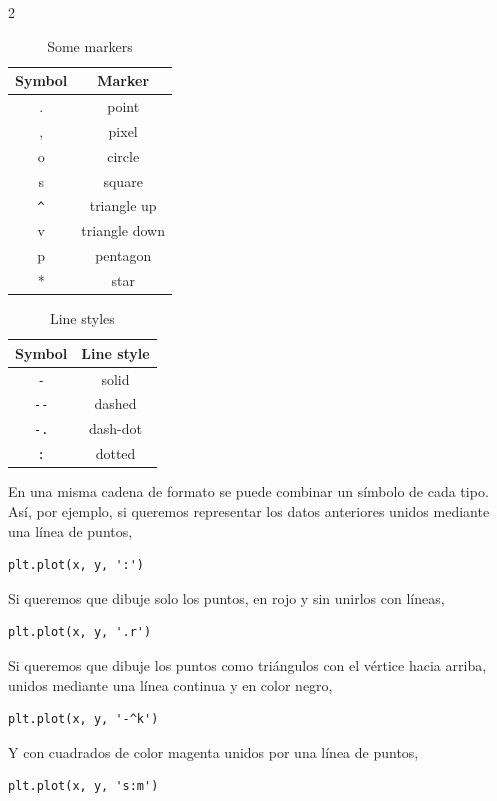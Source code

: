 \begin{paracol}{2}
    \begin{table}
        \centering
        \begin{tabular}{|c|c|} \hline
        \textbf{Symbol}     &  \textbf{Marker}\\ \hline
             .& point \\ \hline
             ,& pixel\\ \hline
             o& circle \\ \hline
             s& square\\ \hline
             \texttt{\^{}} & triangle up\\ \hline
             v& triangle down\\ \hline
             p& pentagon\\ \hline
             *& star\\ \hline
        \end{tabular}
        \caption{Some markers}
        \label{tab:dots}
    \end{table}

      \begin{table}
        \centering
        \begin{tabular}{|c|c|} \hline
        \textbf{Symbol}     &  \textbf{Line style}\\ \hline
             \texttt{-}& solid \\ \hline
             \texttt{-{}-}& dashed\\ \hline
             \texttt{-.}& dash-dot\\ \hline
             \texttt{:}& dotted\\ \hline
        \end{tabular}
        \caption{Line styles}
        \label{tab:lines}
    \end{table}

    \switchcolumn
    En una misma cadena de formato se puede combinar un símbolo de cada tipo. Así, por ejemplo, si queremos representar los datos anteriores unidos mediante una línea de puntos,
\begin{verbatim}
plt.plot(x, y, ':')
\end{verbatim}
Si queremos que dibuje solo los puntos, en rojo y sin unirlos con líneas,
\begin{verbatim}
plt.plot(x, y, '.r')
\end{verbatim}
Si queremos que dibuje los puntos como triángulos con el vértice hacia arriba, unidos mediante una línea continua y en color negro,
\begin{verbatim}
plt.plot(x, y, '-^k')
\end{verbatim}
Y con cuadrados de color magenta unidos por una línea de puntos,
\begin{verbatim}
plt.plot(x, y, 's:m')
\end{verbatim}


\end{paracol}
